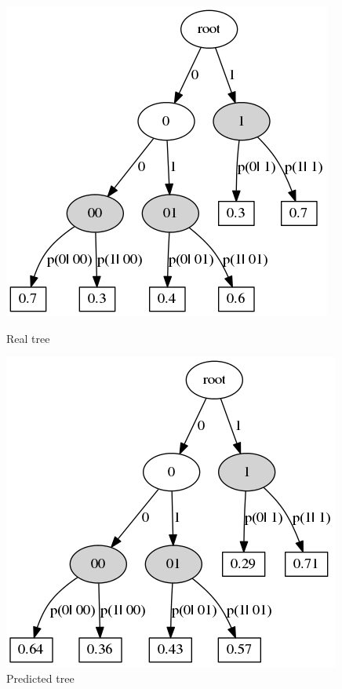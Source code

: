 \documentclass[10pt,a4paper]{article}
\begin{document}
\begin{figure}[ht]\centering
	\parbox[b]{ 0.49 \textwidth}{
	\includegraphics[scale=0.3]{img/eq_3676real_trie_.png}
	\centering
	\caption{Real tree}
	\label{ris:img_eq_Gauss_real_tree}
	
	}
\hfil \hfil%
\begin{minipage}[b]{0.49 \textwidth}
	\includegraphics[scale=0.3]{img/eq_3676trie_.png}
	\centering
	\caption{Predicted tree}
	\label{ris:img_eq_Gauss_predicted_tree}
\end{minipage}
\end{figure}
\end{document}
